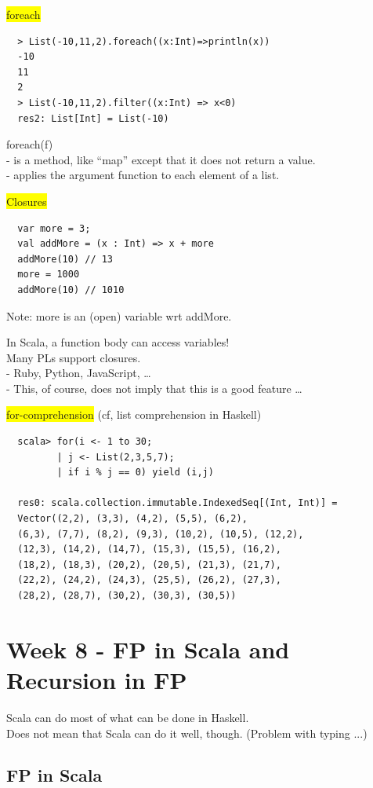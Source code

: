 \documentclass[tikz,border=10pt]{project_plan}
\begin{document}
\colorbox{yellow}{foreach}
\begin{lstlisting}
  > List(-10,11,2).foreach((x:Int)=>println(x))
  -10
  11
  2
  > List(-10,11,2).filter((x:Int) => x<0)
  res2: List[Int] = List(-10)
\end{lstlisting}

foreach(f)\\
- is a method, like “map” except that it does not return a value.\\
- applies the argument function to each element of a list.

\colorbox{yellow}{Closures}
\begin{lstlisting}
  var more = 3;
  val addMore = (x : Int) => x + more
  addMore(10) // 13
  more = 1000
  addMore(10) // 1010
\end{lstlisting}
Note: more is an (open) variable wrt addMore.

In Scala, a function body can access variables!\\
Many PLs support closures.\\
- Ruby, Python, JavaScript, …\\
- This, of course, does not imply that this is a good feature …

\colorbox{yellow}{for-comprehension} (cf, list comprehension in Haskell)
\begin{lstlisting}
  scala> for(i <- 1 to 30;
         | j <- List(2,3,5,7);
         | if i % j == 0) yield (i,j)

  res0: scala.collection.immutable.IndexedSeq[(Int, Int)] =
  Vector((2,2), (3,3), (4,2), (5,5), (6,2),
  (6,3), (7,7), (8,2), (9,3), (10,2), (10,5), (12,2),
  (12,3), (14,2), (14,7), (15,3), (15,5), (16,2),
  (18,2), (18,3), (20,2), (20,5), (21,3), (21,7),
  (22,2), (24,2), (24,3), (25,5), (26,2), (27,3),
  (28,2), (28,7), (30,2), (30,3), (30,5))
\end{lstlisting}


\chapter{Week 8 - FP in Scala and Recursion in FP}

Scala can do most of what can be done in Haskell.\\
Does not mean that Scala can do it well, though. (Problem with typing ...)

\section{FP in Scala}
\end{document}
